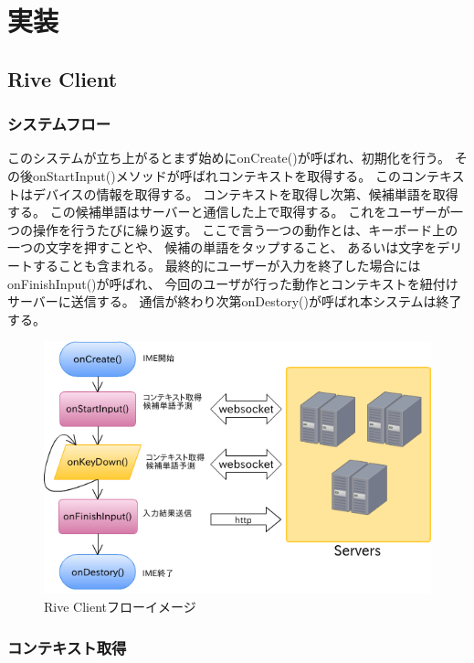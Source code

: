 \chapter{実装}
\label{implementation}

\section{Rive Client}
\label{sec:riveclient}
\subsection{システムフロー}

このシステムが立ち上がるとまず始めにonCreate()が呼ばれ、初期化を行う。
その後onStartInput()メソッドが呼ばれコンテキストを取得する。
このコンテキストはデバイスの情報を取得する。
コンテキストを取得し次第、候補単語を取得する。
この候補単語はサーバーと通信した上で取得する。
これをユーザーが一つの操作を行うたびに繰り返す。
ここで言う一つの動作とは、キーボード上の一つの文字を押すことや、
候補の単語をタップすること、
あるいは文字をデリートすることも含まれる。
最終的にユーザーが入力を終了した場合にはonFinishInput()が呼ばれ、
今回のユーザが行った動作とコンテキストを紐付けサーバーに送信する。
通信が終わり次第onDestory()が呼ばれ本システムは終了する。

\begin{figure}[htbp]
  \begin{center}
    \includegraphics[width=14cm,bb=0 0 562 366]{images/clientflow}
  \end{center}
  \caption{Rive Clientフローイメージ}
  \label{fig:clientflow}
\end{figure}

\subsection{コンテキスト取得}

